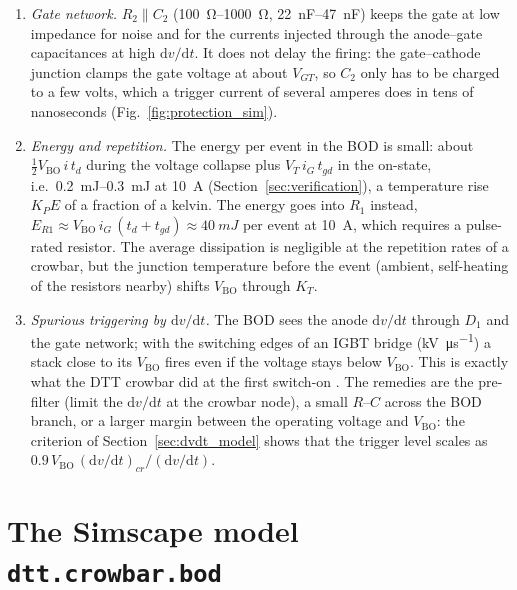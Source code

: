 \documentclass[11pt,a4paper]{article}
\newcommand{\Vbo}{V_{\mathrm{BO}}}
\newcommand{\dvdt}{\mathrm{d}v/\mathrm{d}t}
\newcommand{\ssc}[1]{\texttt{#1}}
\begin{document}
\begin{enumerate}
\item \emph{Gate network.} $R_2\parallel C_2$ (\SIrange{100}{1000}{\ohm}, \SIrange{22}{47}{nF}) keeps the gate at low impedance for noise and for the currents injected through the anode--gate capacitances at high $\dvdt$. It does not delay the firing: the gate--cathode junction clamps the gate voltage at about $V_{GT}$, so $C_2$ only has to be charged to a few volts, which a trigger current of several amperes does in tens of nanoseconds (Fig.~\ref{fig:protection_sim}).
\item \emph{Energy and repetition.} The energy per event in the BOD is small: about $\tfrac{1}{2}\Vbo\, i\, t_d$ during the voltage collapse plus $V_T\, i_G\, t_{gd}$ in the on-state, i.e.\ \SIrange{0.2}{0.3}{mJ} at \SI{10}{A} (Section~\ref{sec:verification}), a temperature rise $K_P E$ of a fraction of a kelvin. The energy goes into $R_1$ instead, $E_{R1}\approx \Vbo\, i_G\,(t_d+t_{gd}) \approx \SI{40}{mJ}$ per event at \SI{10}{A}, which requires a pulse-rated resistor. The average dissipation is negligible at the repetition rates of a crowbar, but the junction temperature before the event (ambient, self-heating of the resistors nearby) shifts $\Vbo$ through $K_T$.
\item \emph{Spurious triggering by $\dvdt$.} The BOD sees the anode $\dvdt$ through $D_1$ and the gate network; with the switching edges of an IGBT bridge (\si{kV\per\micro\second}) a stack close to its $\Vbo$ fires even if the voltage stays below $\Vbo$. This is exactly what the DTT crowbar did at the first switch-on \cite{crowbardtt}. The remedies are the pre-filter (limit the $\dvdt$ at the crowbar node), a small $R$--$C$ across the BOD branch, or a larger margin between the operating voltage and $\Vbo$: the criterion of Section~\ref{sec:dvdt_model} shows that the trigger level scales as $0.9\,\Vbo\,(\dvdt)_{cr}/(\dvdt)$.
\end{enumerate}

\section{The Simscape model \ssc{dtt.crowbar.bod}}
\label{sec:model}
\end{document}
